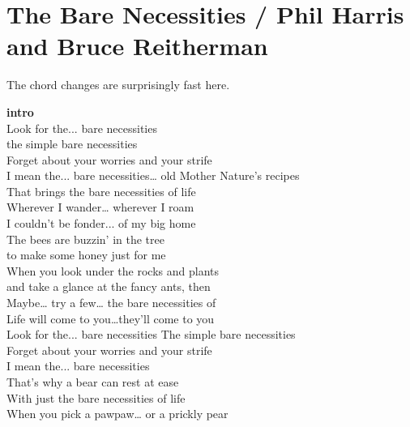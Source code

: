 \section{The Bare Necessities / Phil Harris and Bruce Reitherman}\label{sec:barenecessities}
{\small The chord changes are surprisingly fast here.}
\Gmajor
\Gseven
\Cmajor
\Cseven
\Eseven
\Aseven
\Dseven
\Cminor

\textbf{intro} \\
Look for the...  bare necessities\\
the simple bare necessities\\
Forget about your worries and your strife \\
I mean the...  bare necessities…
old Mother Nature's recipes\\
That brings the bare necessities of life\\
Wherever I wander… wherever I roam\\
I couldn't be fonder... of my big home \\
The bees are buzzin' in the tree\\
to make some honey just for me\\
When you look under the rocks and plants\\
and take a glance at the fancy ants, then\\
Maybe… try a few… the bare necessities of\\
Life will come to you…they’ll come to you\\
Look for the...  bare necessities
The simple bare necessities\\
Forget about your worries and your strife \\
I mean the...  bare necessities\\
That's why a bear can rest at ease\\
With just the bare necessities of life\\
When you pick a pawpaw… or a prickly pear\\
